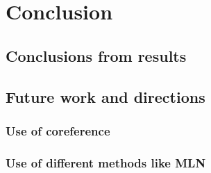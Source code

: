 \chapter{Conclusion}\label{chapter:conclusion}

\section{Conclusions from results}

\section{Future work and directions}

\subsection{Use of coreference}

\subsection{Use of different methods like MLN}